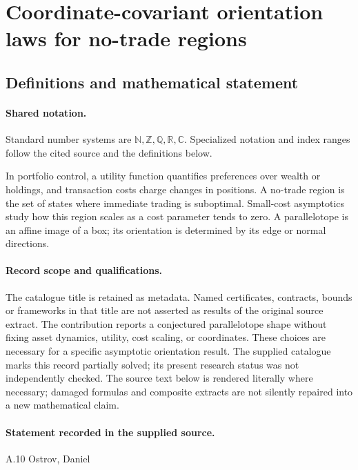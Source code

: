 \documentclass[11pt]{article}
\begin{document}
\section{Coordinate-covariant orientation laws for no-trade regions}\label{statement}

\subsection{Definitions and mathematical statement}

\paragraph{Shared notation.}Standard number systems are $\mathbb N,\mathbb Z,\mathbb Q,\mathbb R,\mathbb C$. Specialized notation and index ranges follow the cited source and the definitions below.


In portfolio control, a utility function quantifies preferences over wealth or holdings, and transaction costs charge changes in positions. A no-trade region is the set of states where immediate trading is suboptimal. Small-cost asymptotics study how this region scales as a cost parameter tends to zero. A parallelotope is an affine image of a box; its orientation is determined by its edge or normal directions.
\paragraph{Record scope and qualifications.}
The catalogue title is retained as metadata. Named certificates, contracts, bounds or frameworks in that title are not asserted as results of the original source extract.
The contribution reports a conjectured parallelotope shape without fixing asset dynamics, utility, cost scaling, or coordinates. These choices are necessary for a specific asymptotic orientation result. The supplied catalogue marks this record partially solved; its present research status was not independently checked.
The source text below is rendered literally where necessary; damaged formulas and composite extracts are not silently repaired into a new mathematical claim.
\paragraph{Statement recorded in the supplied source.}
A.10 Ostrov, Daniel
\end{document}
